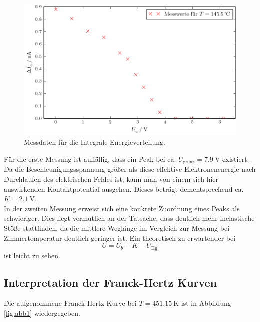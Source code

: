 \begin{figure}[H]
  \centering
  \includegraphics{build/aufgabenteil_a_plot_2.pdf}
  \caption{Messdaten für die Integrale Energieverteilung.}
  \label{fig:plot2}
\end{figure}

Für die erste Messung ist auffällig, dass ein Peak bei ca. $U_{\text{grenz}} = \SI{7.9}{\volt}$ existiert.
Da die Beschleunigungsspannung größer als diese effektive Elektronenenergie nach Durchlaufen des elektrischen Feldes ist, kann man von einem sich hier auswirkenden Kontaktpotential ausgehen.
Dieses beträgt dementsprechend ca. $K = \SI{2.1}{\volt}$.\\
In der zweiten Messung erweist sich eine konkrete Zuordnung eines Peaks als schwieriger.
Dies liegt vermutlich an der Tatsache, dass deutlich mehr inelastische Stöße stattfinden, da die mittlere Weglänge im Vergleich zur Messung bei Zimmertemperatur deutlich geringer ist.
Ein theoretisch zu erwartender bei
\begin{equation}
  U = U_b - K - U_{\text{Hg}}
\end{equation}
ist leicht zu sehen.  %

\subsection{Interpretation der Franck-Hertz Kurven}
Die aufgenommene Franck-Hertz-Kurve bei $T = \SI{451.15}{\kelvin}$ ist in Abbildung \ref{fig:abb1} wiedergegeben.

